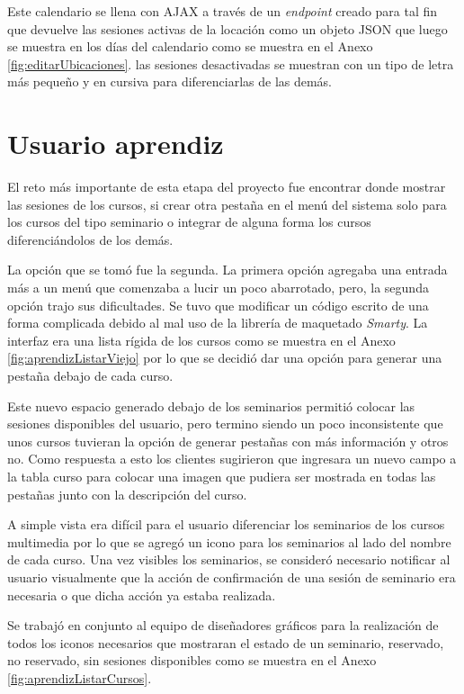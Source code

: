 	Este calendario se llena con \gls{AJAX} a través de un \emph{endpoint} creado para tal fin que devuelve las sesiones activas de la locación como un objeto \gls{JSON} que luego se muestra en los días del calendario como se muestra en el Anexo \ref{fig:editarUbicaciones}. las sesiones desactivadas se muestran con un tipo de letra más pequeño y en cursiva para diferenciarlas de las demás.

	\section{Usuario aprendiz} %
	\label{sec:interfaz_para_el_usuario_aprendiz}
	
	El reto más importante de esta etapa del proyecto fue encontrar donde mostrar las sesiones de los cursos, si crear otra pestaña en el menú del sistema solo para los cursos del tipo seminario o integrar de alguna forma los cursos diferenciándolos de los demás.

	La opción que se tomó fue la segunda. La primera opción agregaba una entrada más a un menú que comenzaba a lucir un poco abarrotado, pero, la segunda opción trajo sus dificultades. Se tuvo que modificar un código escrito de una forma complicada debido al mal uso de la librería de maquetado \emph{Smarty}. La interfaz era una lista rígida de los cursos como se muestra en el Anexo \ref{fig:aprendizListarViejo} por lo que se decidió dar una opción para generar una pestaña debajo de cada curso.

	Este nuevo espacio generado debajo de los seminarios permitió colocar las sesiones disponibles del usuario, pero termino siendo un poco inconsistente que unos cursos tuvieran la opción de generar pestañas con más información y otros no. Como respuesta a esto los clientes sugirieron que ingresara un nuevo campo a la tabla curso para colocar una imagen que pudiera ser mostrada en todas las pestañas junto con la descripción del curso.

	A simple vista era difícil para el usuario diferenciar los seminarios de los cursos multimedia por lo que se agregó un icono para los seminarios al lado del nombre de cada curso. Una vez visibles los seminarios, se consideró necesario notificar al usuario visualmente que la acción de confirmación de una sesión de seminario era necesaria o que dicha acción ya estaba realizada.

	Se trabajó en conjunto al equipo de diseñadores gráficos para la realización de todos los iconos necesarios que mostraran el estado de un seminario, reservado, no reservado, sin sesiones disponibles como se muestra en el Anexo \ref{fig:aprendizListarCursos}.

